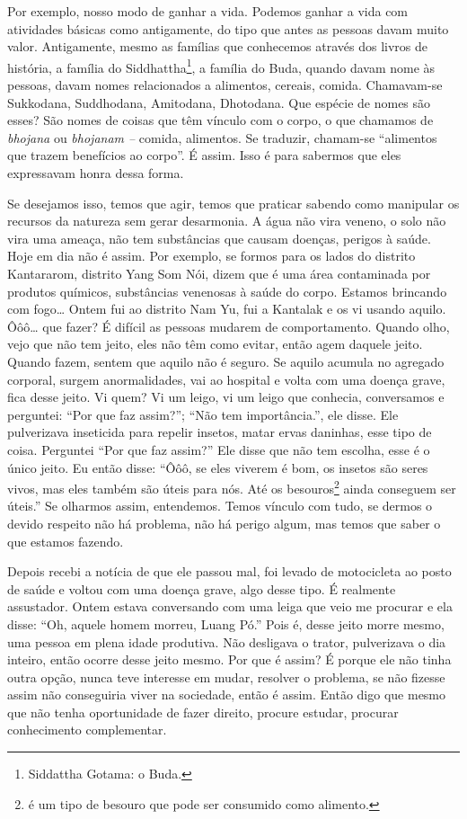Por exemplo, nosso modo de ganhar a vida. Podemos ganhar a vida com
atividades básicas como antigamente, do tipo que antes as pessoas davam
muito valor. Antigamente, mesmo as famílias que conhecemos através dos
livros de história, a família do Siddhattha\footnote{Siddattha Gotama:
o Buda.}, a família do Buda, quando davam nome às pessoas, davam nomes
relacionados a alimentos, cereais, comida. Chamavam-se Sukkodana,
Suddhodana, Amitodana, Dhotodana. Que espécie de nomes são esses? São
nomes de coisas que têm vínculo com o corpo, o que chamamos de
\textit{bhojana} ou \textit{bhojanam – }comida, alimentos. Se traduzir,
chamam-se “alimentos que trazem benefícios
ao corpo”. É assim. Isso é para sabermos que eles expressavam honra
dessa forma. 

Se desejamos isso, temos que agir, temos que praticar sabendo como
manipular os recursos da natureza sem gerar desarmonia. A água não vira
veneno, o solo não vira uma ameaça, não tem substâncias que causam
doenças, perigos à saúde. Hoje em dia não é assim. Por exemplo, se
formos para os lados do distrito Kantararom, distrito Yang Som Nói,
dizem que é uma área contaminada por produtos químicos, substâncias
venenosas à saúde do corpo. Estamos brincando com fogo… Ontem fui ao
distrito Nam Yu, fui a Kantalak e os vi usando aquilo. Ôôô… que fazer?
É difícil as pessoas mudarem de comportamento. Quando olho, vejo que
não tem jeito, eles não têm como evitar, então agem daquele jeito.
Quando fazem, sentem que aquilo não é seguro. Se aquilo acumula no
agregado corporal, surgem anormalidades, vai ao hospital e volta com
uma doença grave, fica desse jeito. Vi quem? Vi um leigo, vi um leigo
que conhecia, conversamos e perguntei: “Por que faz assim?”; “Não tem
importância.”, ele disse. Ele pulverizava inseticida para repelir
insetos, matar ervas daninhas, esse tipo de coisa. Perguntei “Por que
faz assim?” Ele disse que não tem escolha, esse é o único jeito. Eu
então disse: “Ôôô, se eles viverem é bom, os insetos são seres vivos,
mas eles também são úteis para nós. Até os
besouros\footnote{ é um
tipo de besouro que pode ser consumido como alimento.} ainda conseguem
ser úteis.” Se olharmos assim, entendemos. Temos vínculo com tudo, se
dermos o devido respeito não há problema, não há perigo algum, mas
temos que saber o que estamos fazendo. 

Depois recebi a notícia de que ele passou mal, foi levado de
motocicleta ao posto de saúde e voltou com uma doença grave, algo desse
tipo. É realmente assustador. Ontem estava conversando com uma leiga
que veio me procurar e ela disse: “Oh, aquele homem morreu, Luang Pó.”
Pois é, desse jeito morre mesmo, uma pessoa em plena idade produtiva.
Não desligava o trator, pulverizava o dia inteiro, então ocorre desse
jeito mesmo. Por que é assim? É porque ele não tinha outra opção, nunca
teve interesse em mudar, resolver o problema, se não fizesse assim não
conseguiria viver na sociedade, então é assim. Então digo que mesmo que
não tenha oportunidade de fazer direito, procure estudar, procurar
conhecimento complementar.

